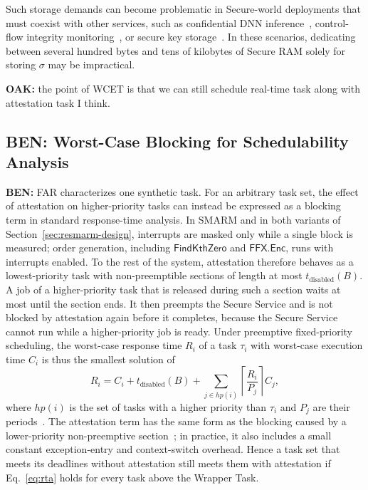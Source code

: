 \documentclass{ieeeaccess}
\DeclareRobustCommand{\oak}[1]{{\color{OAKcolor}\textbf{OAK:} #1}}
\DeclareRobustCommand{\ben}[1]{{\color{BENcolor}\textbf{BEN:} #1}}
\begin{document}
Such storage demands can become problematic in Secure-world deployments that must coexist with other services, such as confidential DNN inference~\cite{tslices}, control-flow integrity monitoring~\cite{tzmcfi}, or secure key storage~\cite{silabs-secure-key-storage}.
In these scenarios, dedicating between several hundred bytes and tens of kilobytes of Secure RAM solely for storing $\sigma$ may be impractical.

\oak{the point of WCET is that we can still schedule real-time task along with attestation task I think.}
\subsection{\ben{Worst-Case Blocking for Schedulability Analysis}}
\label{sec:blocking}
\ben{FAR characterizes one synthetic task.
For an arbitrary task set, the effect of attestation on higher-priority tasks can instead be expressed as a blocking term in standard response-time analysis.
In SMARM and in both variants of Section~\ref{sec:resmarm-design}, interrupts are masked only while a single block is measured; order generation, including $\mathsf{FindKthZero}$ and $\mathsf{FFX.Enc}$, runs with interrupts enabled.
To the rest of the system, attestation therefore behaves as a lowest-priority task with non-preemptible sections of length at most $t_{\text{disabled}}(B)$.
A job of a higher-priority task that is released during such a section waits at most until the section ends.
It then preempts the Secure Service and is not blocked by attestation again before it completes, because the Secure Service cannot run while a higher-priority job is ready.
Under preemptive fixed-priority scheduling, the worst-case response time $R_i$ of a task $\tau_i$ with worst-case execution time $C_i$ is thus the smallest solution of
\begin{equation}
  R_i = C_i + t_{\text{disabled}}(B) + \sum_{j \in hp(i)} \left\lceil \frac{R_i}{P_j} \right\rceil C_j,
  \label{eq:rta}
\end{equation}
where $hp(i)$ is the set of tasks with a higher priority than $\tau_i$ and $P_j$ are their periods~\cite{joseph1986response,audsley1993applying,buttazzo2011hard}.
The attestation term has the same form as the blocking caused by a lower-priority non-preemptive section~\cite{sha1990priority}; in practice, it also includes a small constant exception-entry and context-switch overhead.
Hence a task set that meets its deadlines without attestation still meets them with attestation if Eq.~\eqref{eq:rta} holds for every task above the Wrapper Task.
}
\end{document}

